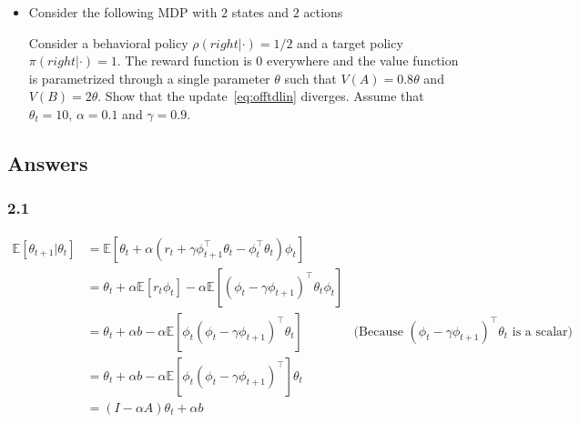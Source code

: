 \documentclass[a4paper]{article}
\newcommand{\transp}{\intercal}
\begin{document}
\begin{itemize}
    \item Consider the following MDP with $2$ states and $2$ actions
          \begin{center}
          \end{center}
          Consider a behavioral policy $\rho(right| \cdot) = 1/2$ and a target policy $\pi(right|\cdot) = 1$.
          The reward function is $0$ everywhere and the value function is parametrized through a single parameter $\theta$ such that $V(A)= 0.8\theta$ and $V(B) = 2\theta$.
          Show that the update~\eqref{eq:offtdlin} diverges. Assume that $\theta_t = 10$, $\alpha = 0.1$ and $\gamma =0.9$.
\end{itemize}

\subsection*{Answers}
\subsubsection*{2.1}
\begin{equation*}
    \begin{aligned}
        \mathbb{E}[\theta_{t+1}|\theta_t] & = \mathbb{E}\left[\theta_t + \alpha \left(r_t + \gamma \phi_{t+1}^\transp \theta_t - \phi_t^\transp \theta_t\right) \phi_t\right]                                                                                          \\
                                          & = \theta_t + \alpha \mathbb{E}\left[r_t \phi_t\right] - \alpha \mathbb{E}\left[(\phi_t - \gamma \phi_{t+1})^\transp \theta_t \phi_t \right]                                                                                \\
                                          & = \theta_t + \alpha b - \alpha \mathbb{E}\left[ \phi_t (\phi_t - \gamma \phi_{t+1})^\transp \theta_t \right]                                & \text{(Because $(\phi_t - \gamma \phi_{t+1})^\transp \theta_t$ is a scalar)} \\
                                          & = \theta_t + \alpha b - \alpha \mathbb{E}\left[ \phi_t (\phi_t - \gamma \phi_{t+1})^\transp\right] \theta_t                                                                                                                \\
                                          & \boxed{= (I - \alpha A) \theta_t + \alpha b}
    \end{aligned}
\end{equation*}
\end{document}
